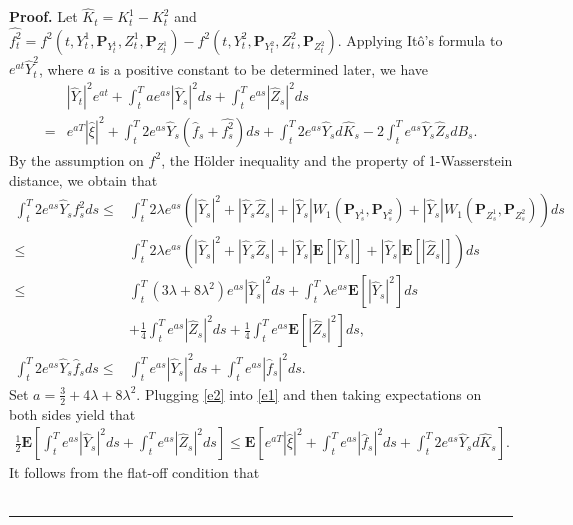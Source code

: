 \documentclass[10pt]{article}%
\numberwithin{equation}{section}
\newenvironment{proof}[1][Proof]{\noindent \textbf{#1.} }{\  \rule{0.5em}{0.5em}}
\def \E{\mathbf{E}}
\def \P{\mathbf{P}}
\begin{document}
\begin{proof}%
 Let $\hat{K}_t=K^1_t-K^2_t$ and $\widehat{f^2_t}=f^2(t,Y^1_t,\P_{Y^1_t},Z^1_t,\P_{Z^1_t})-f^2(t,Y^2_t,\P_{Y^2_t},Z_t^2,\P_{Z^2_t})$. Applying It\^{o}'s formula to $e^{at}\hat{Y}_t^2$, where $a$ is a positive constant to be determined later, we have
\begin{equation}
\begin{split}\label{e1}
&|\hat{Y}_t|^2 e^{at}+\int_t^T ae^{as}|\hat{Y}_s|^2 ds+\int_t^T e^{as} |\hat{Z}_s|^2 ds\\
=&e^{aT}|\hat{\xi}|^2+\int_t^T 2e^{as}\hat{Y}_s \left(\hat{f}_s+\widehat{f^2_s}\right) ds+\int_t^T 2e^{as}\hat{Y}_s d\hat{K}_s-2\int_t^T e^{as}\hat{Y}_s\hat{Z}_sdB_s.
\end{split}
\end{equation}
By the assumption on $f^2$, the H\"{o}lder inequality and the property of 1-Wasserstein distance, we obtain that
\begin{equation}
\begin{split}\label{e2}
\int_t^T 2e^{as}\hat{Y}_s \widehat{f^2_s} ds\leq &\int_t^T 2\lambda e^{as}\left(|\hat{Y}_s|^2+|\hat{Y}_s\hat{Z}_s|+|\hat{Y}_s|W_1\left(\P_{Y^1_s},\P_{Y^2_s}\right)+|\hat{Y}_s|W_1\left(\P_{Z^1_s},\P_{Z^2_s}\right)\right) ds\\
\leq &\int_t^T 2\lambda e^{as}\left(|\hat{Y}_s|^2+|\hat{Y}_s\hat{Z}_s|+|\hat{Y}_s|\E[|\hat{Y}_s|]+|\hat{Y}_s|\E[|\hat{Z}_s|]\right) ds\\
\leq& \int_t^T (3\lambda+8\lambda^2)e^{as}|\hat{Y}_s|^2 ds+\int_t^T \lambda e^{as}\E[|\hat{Y}_s|^2]ds\\
&+\frac{1}{4}\int_t^T e^{as}|\hat{Z}_s|^2 ds+\frac{1}{4}\int_t^T e^{as}\E[|\hat{Z}_s|^2] ds,\\
\int_t^T 2e^{as}\hat{Y}_s \hat{f}_s ds\leq &\int_t^T e^{as}|\hat{Y}_s|^2 ds+\int_t^T e^{as}|\hat{f}_s|^2 ds.
\end{split}
\end{equation}
Set $a=\frac{3}{2}+4\lambda+8\lambda^2$. Plugging \eqref{e2} into \eqref{e1} and then taking expectations on both sides yield that 
\begin{align}\label{e3'}
\frac{1}{2}\E\left[\int_t^T e^{as}|\hat{Y}_s|^2 ds+\int_t^T e^{as} |\hat{Z}_s|^2 ds\right]\leq \E\left[e^{aT}|\hat{\xi}|^2+\int_t^T e^{as}|\hat{f}_s|^2 ds+ \int_t^T 2e^{as}\hat{Y}_s d\hat{K}_s\right].
\end{align}
It follows from the flat-off condition that 
\begin{equation}\label{e3}

\end{equation}
\end{proof}
\end{document}
